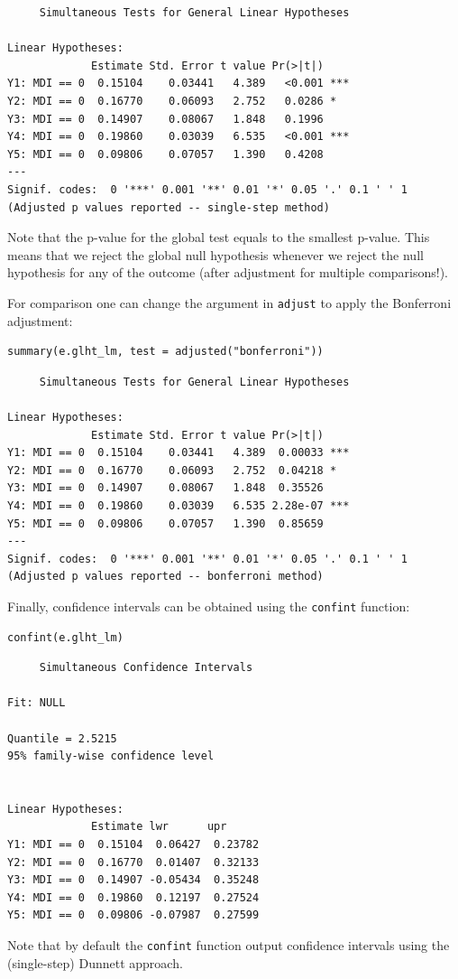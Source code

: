 \documentclass{article}
\begin{document}
\begin{verbatim}
	 Simultaneous Tests for General Linear Hypotheses

Linear Hypotheses:
             Estimate Std. Error t value Pr(>|t|)    
Y1: MDI == 0  0.15104    0.03441   4.389   <0.001 ***
Y2: MDI == 0  0.16770    0.06093   2.752   0.0286 *  
Y3: MDI == 0  0.14907    0.08067   1.848   0.1996    
Y4: MDI == 0  0.19860    0.03039   6.535   <0.001 ***
Y5: MDI == 0  0.09806    0.07057   1.390   0.4208    
---
Signif. codes:  0 '***' 0.001 '**' 0.01 '*' 0.05 '.' 0.1 ' ' 1
(Adjusted p values reported -- single-step method)
\end{verbatim}

Note that the p-value for the global test equals to the smallest
 p-value. This means that we reject the global null hypothesis
 whenever we reject the null hypothesis for any of the outcome (after
 adjustment for multiple comparisons!).


For comparison one can change the argument in \texttt{adjust} to apply the
Bonferroni adjustment:
\lstset{language=r,label= ,caption= ,captionpos=b,numbers=none}
\begin{lstlisting}
summary(e.glht_lm, test = adjusted("bonferroni"))
\end{lstlisting}

\begin{verbatim}
	 Simultaneous Tests for General Linear Hypotheses

Linear Hypotheses:
             Estimate Std. Error t value Pr(>|t|)    
Y1: MDI == 0  0.15104    0.03441   4.389  0.00033 ***
Y2: MDI == 0  0.16770    0.06093   2.752  0.04218 *  
Y3: MDI == 0  0.14907    0.08067   1.848  0.35526    
Y4: MDI == 0  0.19860    0.03039   6.535 2.28e-07 ***
Y5: MDI == 0  0.09806    0.07057   1.390  0.85659    
---
Signif. codes:  0 '***' 0.001 '**' 0.01 '*' 0.05 '.' 0.1 ' ' 1
(Adjusted p values reported -- bonferroni method)
\end{verbatim}

Finally, confidence intervals can be obtained using the \texttt{confint}
function:
\lstset{language=r,label= ,caption= ,captionpos=b,numbers=none}
\begin{lstlisting}
confint(e.glht_lm)
\end{lstlisting}

\begin{verbatim}
	 Simultaneous Confidence Intervals

Fit: NULL

Quantile = 2.5215
95% family-wise confidence level
 

Linear Hypotheses:
             Estimate lwr      upr     
Y1: MDI == 0  0.15104  0.06427  0.23782
Y2: MDI == 0  0.16770  0.01407  0.32133
Y3: MDI == 0  0.14907 -0.05434  0.35248
Y4: MDI == 0  0.19860  0.12197  0.27524
Y5: MDI == 0  0.09806 -0.07987  0.27599
\end{verbatim}
Note that by default the \texttt{confint} function output confidence
intervals using the (single-step) Dunnett approach.
\end{document}
